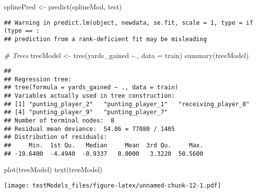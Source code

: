 \documentclass[
]{article}
\newenvironment{Shaded}{\begin{snugshade}}{\end{snugshade}}
\newcommand{\AttributeTok}[1]{\textcolor[rgb]{0.77,0.63,0.00}{#1}}
\newcommand{\CommentTok}[1]{\textcolor[rgb]{0.56,0.35,0.01}{\textit{#1}}}
\newcommand{\DecValTok}[1]{\textcolor[rgb]{0.00,0.00,0.81}{#1}}
\newcommand{\FunctionTok}[1]{\textcolor[rgb]{0.00,0.00,0.00}{#1}}
\newcommand{\NormalTok}[1]{#1}
\newcommand{\OtherTok}[1]{\textcolor[rgb]{0.56,0.35,0.01}{#1}}
\newcommand{\SpecialCharTok}[1]{\textcolor[rgb]{0.00,0.00,0.00}{#1}}
\begin{document}
\begin{Shaded}
\begin{Highlighting}[]
\NormalTok{splinePred }\OtherTok{\textless{}{-}} \FunctionTok{predict}\NormalTok{(splineMod, test)}
\end{Highlighting}
\end{Shaded}

\begin{verbatim}
## Warning in predict.lm(object, newdata, se.fit, scale = 1, type = if (type == :
## prediction from a rank-deficient fit may be misleading
\end{verbatim}

\begin{Shaded}
\end{Shaded}

\begin{Shaded}
\begin{Highlighting}[]
\CommentTok{\# Trees}
\NormalTok{treeModel }\OtherTok{\textless{}{-}} \FunctionTok{tree}\NormalTok{(yards\_gained }\SpecialCharTok{\textasciitilde{}}\NormalTok{., }\AttributeTok{data =}\NormalTok{ train)}
\FunctionTok{summary}\NormalTok{(treeModel)}
\end{Highlighting}
\end{Shaded}

\begin{verbatim}
## 
## Regression tree:
## tree(formula = yards_gained ~ ., data = train)
## Variables actually used in tree construction:
## [1] "punting_player_2"   "punting_player_1"   "receiving_player_8"
## [4] "punting_player_9"   "punting_player_7"  
## Number of terminal nodes:  8 
## Residual mean deviance:  54.86 = 77080 / 1405 
## Distribution of residuals:
##     Min.  1st Qu.   Median     Mean  3rd Qu.     Max. 
## -19.6400  -4.4940  -0.9337   0.0000   3.3220  50.5600
\end{verbatim}

\begin{Shaded}
\begin{Highlighting}[]
\FunctionTok{plot}\NormalTok{(treeModel)}
\FunctionTok{text}\NormalTok{(treeModel)}
\end{Highlighting}
\end{Shaded}

\texttt{[image: testModels\_files/figure-latex/unnamed-chunk-12-1.pdf]}
\end{document}
